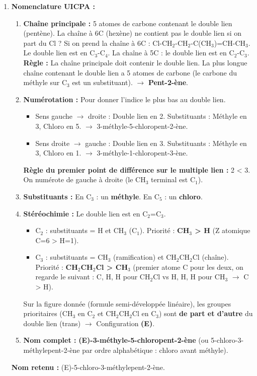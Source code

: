 \documentclass[11pt]{article}
\newcommand{\cle}[1]{{\popxbold\color{popdark}#1}}
\begin{document}
\begin{exoresolu}
\begin{enumerate}
    \item \textbf{Nomenclature UICPA :}
    \begin{enumerate}
        \item \textbf{Chaîne principale :} 5 atomes de carbone contenant le double lien (pentène). La chaîne à 6C (hexène) ne contient pas le double lien si on part du Cl ? Si on prend la chaîne à 6C : Cl-CH$_2$-CH$_2$-C(CH$_3$)=CH-CH$_3$. Le double lien est en C$_3$-C$_4$. La chaîne à 5C : le double lien est en C$_2$-C$_3$. \textbf{Règle :} La chaîne principale doit contenir le double lien. La plus longue chaîne contenant le double lien a 5 atomes de carbone (le carbone du méthyle sur C$_3$ est un substituant). $\rightarrow$ \textbf{Pent-2-ène}.
        \item \textbf{Numérotation :} Pour donner l'indice le plus bas au double lien. 
            \begin{itemize}
                \item Sens gauche $\rightarrow$ droite : Double lien en 2. Substituants : Méthyle en 3, Chloro en 5. $\rightarrow$ 3-méthyle-5-chloropent-2-ène.
                \item Sens droite $\rightarrow$ gauche : Double lien en 3. Substituants : Méthyle en 3, Chloro en 1. $\rightarrow$ 3-méthyle-1-chloropent-3-ène.
            \end{itemize}
            \textbf{Règle du premier point de différence sur le multiple lien :} 2 < 3. On numérote de gauche à droite (le CH$_3$ terminal est C$_1$).
        \item \textbf{Substituants :} En C$_3$ : un \textbf{méthyle}. En C$_5$ : un \textbf{chloro}.
        \item \textbf{Stéréochimie :} Le double lien est en C$_2$=C$_3$.
            \begin{itemize}
                \item C$_2$ : substituants = H et CH$_3$ (C$_1$). Priorité : \textbf{CH$_3$ > H} (Z atomique C=6 > H=1).
                \item C$_3$ : substituants = CH$_3$ (ramification) et CH$_2$CH$_2$Cl (chaîne). Priorité : \textbf{CH$_2$CH$_2$Cl > CH$_3$} (premier atome C pour les deux, on regarde le suivant : C, H, H pour CH$_2$Cl vs H, H, H pour CH$_3$ $\rightarrow$ C > H).
            \end{itemize}
            Sur la figure donnée (formule semi-développée linéaire), les groupes prioritaires (CH$_3$ en C$_2$ et CH$_2$CH$_2$Cl en C$_3$) sont \textbf{de part et d'autre} du double lien (trans) $\rightarrow$ Configuration \textbf{(E)}.
        \item \textbf{Nom complet :} \textbf{(E)-3-méthyle-5-chloropent-2-ène} (ou 5-chloro-3-méthylepent-2-ène par ordre alphabétique : chloro avant méthyle).
    \end{enumerate}
    \textbf{Nom retenu :} \cle{(E)-5-chloro-3-méthylepent-2-ène}.


\end{enumerate}
\end{exoresolu}
\end{document}
